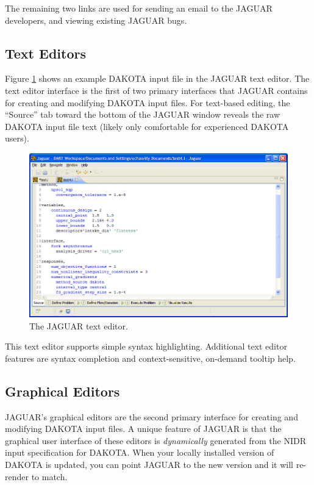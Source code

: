 The remaining two links are used for sending an email to the JAGUAR
developers, and viewing existing JAGUAR bugs.


\subsection{Text Editors}

Figure \ref{fig:input:jag_texteditor} shows an example DAKOTA input
file in the JAGUAR text editor.  The text editor interface is the
first of two primary interfaces that JAGUAR contains for creating and
modifying DAKOTA input files.  For text-based editing, the ``Source''
tab toward the bottom of the JAGUAR window reveals the raw DAKOTA
input file text (likely only comfortable for experienced DAKOTA
users).
\begin{figure}
  \centering
  \includegraphics[scale=0.4]{images/jag_texteditor}
  \caption{The JAGUAR text editor.}
  \label{fig:input:jag_texteditor}
\end{figure}

This text editor supports simple syntax highlighting.  Additional text
editor features are syntax completion and context-sensitive, on-demand tooltip help.


\subsection{Graphical Editors}

JAGUAR's graphical editors are the second primary interface for
creating and modifying DAKOTA input files.  A unique feature of JAGUAR
is that the graphical user interface of these editors is {\em
dynamically} generated from the NIDR input specification for DAKOTA.
When your locally installed version of DAKOTA is updated, you can
point JAGUAR to the new version and it will re-render to match.

